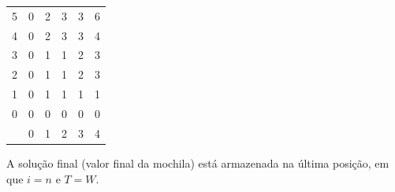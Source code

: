 \begin{example}
	\begin{center}
		\begin{tabular}{c|c|c|c|c|c|}
			\cline{2-6}
			5                                              & 0                     & 2                     & 3                     & 3                     & 6                     \\ \cline{2-6}
			4                                              & 0                     & 2                     & 3                     & 3                     & 4                     \\ \cline{2-6}
			3                                              & 0                     & 1                     & 1                     & 2                     & 3                     \\ \cline{2-6}
			2                                              & 0                     & 1                     & 1                     & 2                     & 3                     \\ \cline{2-6}
			1                                              & 0                     & 1                     & 1                     & 1                     & 1                     \\ \cline{2-6}
			0                                              & 0                     & 0                     & 0                     & 0                     & 0                     \\ \cline{2-6}
			\multicolumn{1}{c}{\diagbox[dir=NE]{$i$}{$T$}} & \multicolumn{1}{c}{0} & \multicolumn{1}{c}{1} & \multicolumn{1}{c}{2} & \multicolumn{1}{c}{3} & \multicolumn{1}{c}{4}
		\end{tabular}
	\end{center}
\end{example}

A solução final (valor final da mochila) está armazenada na última posição, em que $i=n$ e $T=W$.

\begin{algorithm}
	\SetAlgoLined
\end{algorithm}

\vfill

